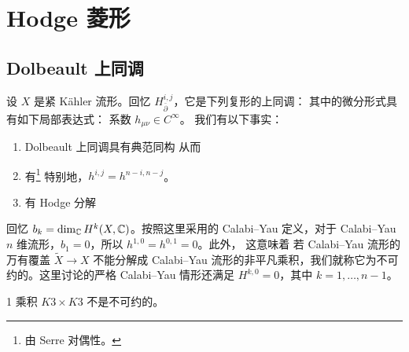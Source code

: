 \section{Hodge 菱形}
\subsection{Dolbeault 上同调}
设 $X$ 是紧 Kähler 流形。回忆  $H^{i,j}_{\bar\partial}$，它是下列复形的上同调：
其中的微分形式具有如下局部表达式：
系数 $h_{\mu\nu}\in C^\infty$。
我们有以下事实：
\begin{enumerate}
\item Dolbeault 上同调具有典范同构
从而
\item 有\footnote{由 Serre 对偶性。}
特别地，$h^{i,j}=h^{n-i,n-j}$。
\item 有 Hodge 分解
\end{enumerate}
回忆 $b_k=\dim_{\mathbb C} H^k(X,\mathbb C)$。按照这里采用的 Calabi–Yau 定义，对于 Calabi–Yau $n$ 维流形，$b_1=0$，所以 $h^{1,0}=h^{0,1}=0$。此外，
这意味着
若 Calabi–Yau 流形的万有覆盖 $\widetilde X\to X$ 不能分解成 Calabi–Yau 流形的非平凡乘积，我们就称它为不可约的。这里讨论的严格 Calabi–Yau 情形还满足 $H^{k,0}=0$，其中 $k=1,\ldots,n-1$。
\begin{Counterexample}{1}\label{ex:1.1}
乘积 $K3\times K3$ 不是不可约的。
\end{Counterexample}
